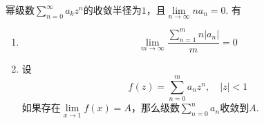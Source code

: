 \begin{theorem}[Tauber定理]

    幂级数$\sum\limits_{n = 0}^{\infty}{a_k z^n}$的收敛半径为$1$，且$\lim\limits_{n \to \infty}{na_n} = 0$. 有

    \begin{enumerate}
        
        \item $$\lim\limits_{m \to \infty}{\dfrac{\sum\limits_{n = 1}^{m}{n|a_n|}}{m}} = 0$$
        
        \item 
            设
            $$f(z) = \sum\limits_{n = 0}^{m}{a_n z^n}, \quad |z| < 1$$
            如果存在$\lim\limits_{x \to 1}{f(x)} = A$，那么级数$\sum\limits_{n = 0}^{n}{a_n}$收敛到$A$.
        
    \end{enumerate}

\end{theorem}

